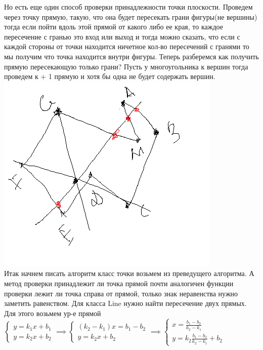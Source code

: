 \documentclass[12pt]{article} %
\begin{document}
 	\hspace*{1cm}Но есть еще один способ проверки принадлежности точки плоскости. Проведем через точку прямую, такую, что она будет пересекать грани фигуры(не вершины) тогда если пойти вдоль этой прямой от какого либо ее края, то каждое пересечение с гранью это вход или выход и тогда можно сказать, что если с каждой стороны от точки находится ничетное кол-во пересечений с гранями то мы получим что точка находится внутри фигуры. Теперь разберемся как получить прямую пересекающую только грани? Пусть у многоугольника к вершин тогда проведем к + 1 прямую и хотя бы одна не будет содержать вершин.\\
 	\includegraphics[scale=0.8]{3}\\
 	\hspace*{1cm}Итак начнем писать алгоритм класс точки возьмем из преведущего алгоритма. А метод проверки принадлежит ли точка прямой почти аналогичен функции проверки лежит ли точка справа от прямой, только знак неравенства нужно заметить равенством. Для класса Line нужно найти пересечение двух прямых. Для этого возьмем ур-е прямой$\begin{cases}y = k_1 x + b_1\\   y = k_2 x + b_2\end{cases} \implies \begin{cases}(k_2 - k_1) x = b_1 - b_2\\   y = k_2 x + b_2\end{cases}\implies \begin{cases}x =\frac{ b_1 - b_2}{k_2 - k_1}\\   y = k_2 \frac{ b_1 - b_2}{k_2 - k_1} + b_2\end{cases}$
\end{document}
